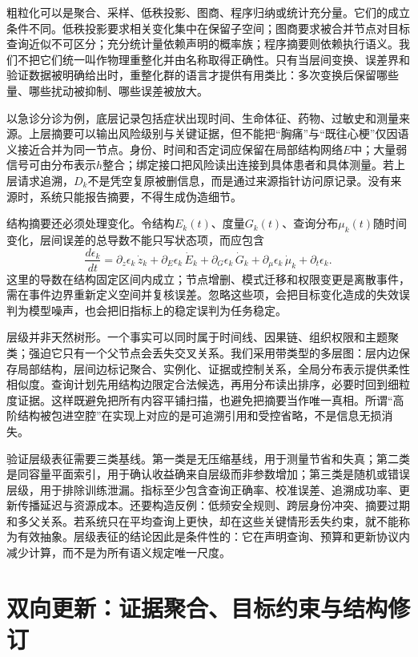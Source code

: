 粗粒化可以是聚合、采样、低秩投影、图商、程序归纳或统计充分量。它们的成立条件不同。低秩投影要求相关变化集中在保留子空间；图商要求被合并节点对目标查询近似不可区分；充分统计量依赖声明的概率族；程序摘要则依赖执行语义。我们不把它们统一叫作物理重整化并由名称取得正确性。只有当层间变换、误差界和验证数据被明确给出时，重整化群的语言才提供有用类比：多次变换后保留哪些量、哪些扰动被抑制、哪些误差被放大。

以急诊分诊为例，底层记录包括症状出现时间、生命体征、药物、过敏史和测量来源。上层摘要可以输出风险级别与关键证据，但不能把“胸痛”与“既往心梗”仅因语义接近合并为同一节点。身份、时间和否定词应保留在局部结构网络$E$中；大量弱信号可由分布表示$h$整合；绑定接口把风险读出连接到具体患者和具体测量。若上层请求追溯，$D_k$不是凭空复原被删信息，而是通过来源指针访问原记录。没有来源时，系统只能报告摘要，不得生成伪造细节。

结构摘要还必须处理变化。令结构$E_k(t)$、度量$G_k(t)$、查询分布$\mu_k(t)$随时间变化，层间误差的总导数不能只写状态项，而应包含
\begin{equation}
 \frac{d\epsilon_k}{dt}=\partial_z\epsilon_k\,\dot z_k+\partial_E\epsilon_k\,\dot E_k+\partial_G\epsilon_k\,\dot G_k+\partial_\mu\epsilon_k\,\dot\mu_k+\partial_t\epsilon_k.
\end{equation}
这里的导数在结构固定区间内成立；节点增删、模式迁移和权限变更是离散事件，需在事件边界重新定义空间并复核误差。忽略这些项，会把目标变化造成的失效误判为模型噪声，也会把旧指标上的稳定误判为任务稳定。

层级并非天然树形。一个事实可以同时属于时间线、因果链、组织权限和主题聚类；强迫它只有一个父节点会丢失交叉关系。我们采用带类型的多层图：层内边保存局部结构，层间边标记聚合、实例化、证据或控制关系，全局分布表示提供柔性相似度。查询计划先用结构边限定合法候选，再用分布读出排序，必要时回到细粒度证据。这样既避免把所有内容平铺扫描，也避免把摘要当作唯一真相。所谓“高阶结构被包进空腔”在实现上对应的是可追溯引用和受控省略，不是信息无损消失。

验证层级表征需要三类基线。第一类是无压缩基线，用于测量节省和失真；第二类是同容量平面索引，用于确认收益确来自层级而非参数增加；第三类是随机或错误层级，用于排除训练泄漏。指标至少包含查询正确率、校准误差、追溯成功率、更新传播延迟与资源成本。还要构造反例：低频安全规则、跨层身份冲突、摘要过期和多父关系。若系统只在平均查询上更快，却在这些关键情形丢失约束，就不能称为有效抽象。层级表征的结论因此是条件性的：它在声明查询、预算和更新协议内减少计算，而不是为所有语义规定唯一尺度。

\section{双向更新：证据聚合、目标约束与结构修订}
\label{sec:dynamical_loop_ricci_sculpting}


